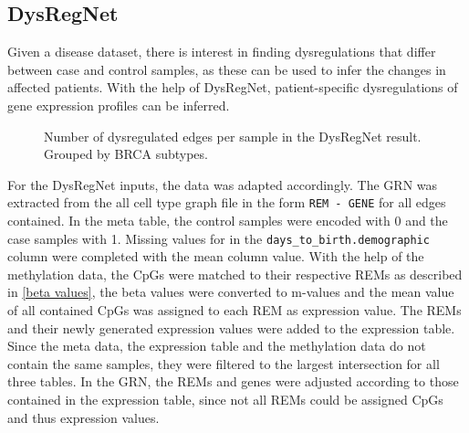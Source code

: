 \documentclass[pdftex,12pt,a4paper]{report}
\begin{document}
\subsection{DysRegNet}
Given a disease dataset, there is interest in finding dysregulations that differ between case and control samples, as these can be used to infer the changes in affected patients. With the help of DysRegNet, patient-specific dysregulations of gene expression profiles can be inferred.
\begin{figure}[!ht]
\begin{center}
	\caption{Number of dysregulated edges per sample in the DysRegNet result. Grouped by BRCA subtypes.}
	\label{edges_per_sample}
\end{center}
\end{figure} 
For the DysRegNet inputs, the data was adapted accordingly. The GRN was extracted from the all cell type graph file in the form \texttt{REM - GENE} for all edges contained. In the meta table, the control samples were encoded with 0 and the case samples with 1. Missing values for in the \texttt{days\_to\_birth.demographic} column were completed with the mean column value. With the help of the methylation data, the CpGs were matched to their respective REMs as described in \ref{beta values}, the beta values were converted to m-values and the mean value of all contained CpGs was assigned to each REM as expression value. 
The REMs and their newly generated expression values were added to the expression table. Since the meta data, the expression table and the methylation data do not contain the same samples, they were filtered to the largest intersection for all three tables. In the GRN, the REMs and genes were adjusted according to those contained in the expression table, since not all REMs could be assigned CpGs and thus expression values.
\end{document}
